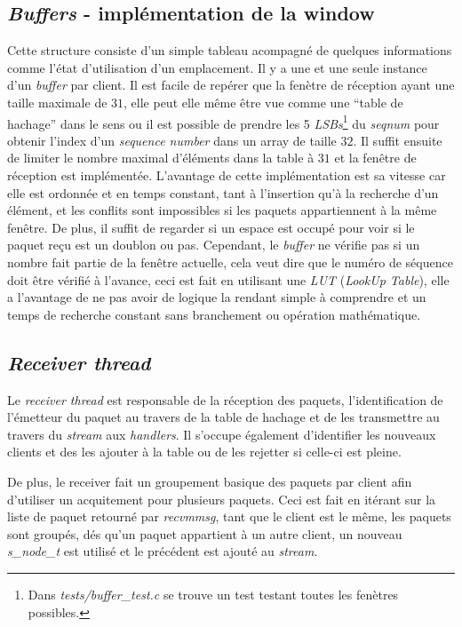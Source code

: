 \documentclass[../main.tex]{subfiles}
\begin{document}
\subsection{\textit{Buffers} - implémentation de la window}
\label{sec:buffer}

Cette structure consiste d'un simple tableau acompagné de quelques informations comme l'état d'utilisation d'un emplacement. Il y a une et une seule instance d'un \textit{buffer} par client.
Il est facile de repérer que la fenètre de réception ayant une taille maximale de $31$, elle peut elle même être vue comme une ``table de hachage'' dans le
sens ou il est possible de prendre les 5 \textit{LSBs}\footnote{ Dans \textit{tests/buffer\_test.c} se trouve un test testant toutes les fenètres possibles.} 
du \textit{seqnum} pour obtenir l'index d'un \textit{sequence number} dans un array de taille $32$. Il suffit ensuite de limiter le nombre maximal d'éléments dans la table 
à $31$ et la fenêtre de réception est implémentée. L'avantage de cette implémentation est sa vitesse car elle est ordonnée et en temps constant, tant à l'insertion
qu'à la recherche d'un élément, et les conflits sont impossibles si les paquets appartiennent à la même fenêtre. De plus, il suffit de regarder si un espace est occupé pour voir si le paquet reçu est un
doublon ou pas. Cependant, le \textit{buffer} ne vérifie pas si un nombre fait partie de la fenêtre actuelle, cela veut dire que le numéro de séquence doit
être vérifié à l'avance, ceci est fait en utilisant une \textit{LUT} (\textit{LookUp Table}), elle a l'avantage de ne pas avoir de logique la rendant simple
à comprendre et un temps de recherche constant sans branchement ou opération mathématique.

\subsection{\textit{Receiver thread}}
\label{sec:receiver}

Le \textit{receiver thread} est responsable de la réception des paquets, l'identification de l'émetteur du paquet au travers de la table de hachage
et de les transmettre au travers du \textit{stream} aux \textit{handlers}. Il s'occupe également d'identifier les nouveaux clients et 
des les ajouter à la table ou de les rejetter si celle-ci est pleine.

De plus, le receiver fait un groupement basique des paquets par client afin d'utiliser un acquitement pour plusieurs paquets. Ceci est fait
en itérant sur la liste de paquet retourné par \textit{recvmmsg}, tant que le client est le même, les paquets sont groupés, dés qu'un paquet
appartient à un autre client, un nouveau \textit{s\_node\_t} est utilisé et le précédent est ajouté au \textit{stream}.
\end{document}
